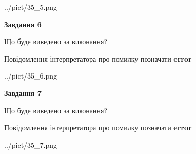 \documentclass[10pt, ukrainian]{article}
\begin{document}
{\begin {large}
\begin{center}
	{../pict/35_5.png}
\end{center}
\newpage

{\begin {center}\textbf{Завдання 6}\end {center}}\par
Що буде виведено за виконання? \par
Повідомлення інтерпретатора про помилку позначати \textbf{error}

\begin{center}
	{../pict/35_6.png}
\end{center}
\newpage

{\begin {center}\textbf{Завдання 7}\end {center}}\par
Що буде виведено за виконання? \par
Повідомлення інтерпретатора про помилку позначати \textbf{error}

\begin{center}
	{../pict/35_7.png}
\end{center}
\newpage

\end {large}}
\end{document}

